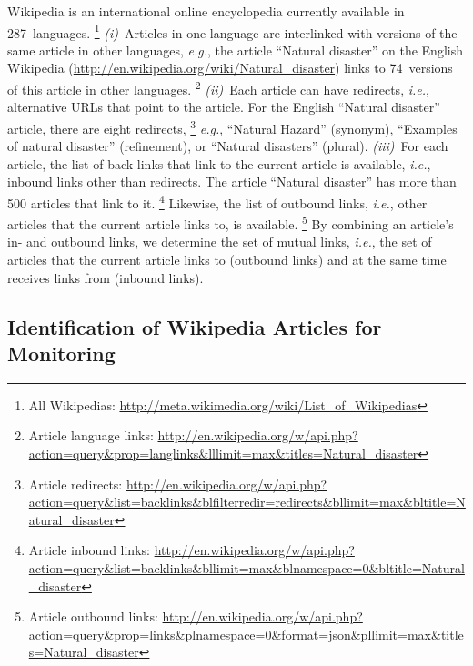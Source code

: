 \documentclass[runningheads,a4paper]{llncs}
\begin{document}
Wikipedia is an international online encyclopedia
currently available in 287~languages.%
\footnote{All Wikipedias: \url{http://meta.wikimedia.org/wiki/List_of_Wikipedias}}
\emph{(i)}~Articles in one language are interlinked with versions of the same article
in other languages, \emph{e.g.}, the article ``Natural disaster''
on the English Wikipedia
(\url{http://en.wikipedia.org/wiki/Natural_disaster}) \linebreak
links to 74~versions of this article in other languages.%
\footnote{Article language links:
\url{http://en.wikipedia.org/w/api.php?action=query&prop=langlinks&lllimit=max&titles=Natural_disaster}}
\emph{(ii)}~Each article can have redirects, \emph{i.e.}, alternative URLs
that point to the article.
For the English ``Natural disaster'' article, there are eight redirects,%
\footnote{Article redirects:
\url{http://en.wikipedia.org/w/api.php?action=query&list=backlinks&blfilterredir=redirects&bllimit=max&bltitle=Natural_disaster}}
\emph{e.g.}, ``Natural Hazard'' (synonym),
``Examples of natural disaster'' (refinement), or
``Natural disasters'' (plural).
\emph{(iii)}~For each article, the list of back links
that link to the current article is available, \emph{i.e.},
inbound links other than redirects.
The article ``Natural disaster'' has more than 500 articles that link to it.%
\footnote{Article inbound links: \url{http://en.wikipedia.org/w/api.php?action=query&list=backlinks&bllimit=max&blnamespace=0&bltitle=Natural_disaster}}
Likewise, the list of outbound links, \emph{i.e.}, other articles
that the current article links to, is available.%
\footnote{Article outbound links: \url{http://en.wikipedia.org/w/api.php?action=query&prop=links&plnamespace=0&format=json&pllimit=max&titles=Natural_disaster}}
By combining an article's in- and outbound links,
we determine the set of mutual links,
\emph{i.e.}, the set of articles that the current article links to (outbound links)
and at the same time receives links from (inbound links).

\subsection{Identification of Wikipedia Articles for Monitoring}
\label{sec:identification-of-monitoring}
\end{document}
